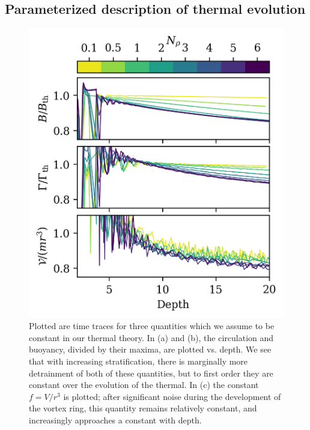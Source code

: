 \documentclass[twocolumn, amsmath, amsfonts, amssymb, trackchanges]{aastex62}
\begin{document}
\subsection{Parameterized description of thermal evolution}
\begin{figure}[t!]
    \includegraphics[width=\columnwidth]{constants.png}
    \caption{Plotted are time traces for three quantities which we assume to be constant
	in our thermal theory. In (a) and (b), the circulation and buoyancy, divided by their
	maxima, are plotted vs. depth. We see that with increasing stratification, there is marginally
	more detrainment of both of these quantities, but to first order they are constant over the
	evolution of the thermal. In (c) the constant $f = V/r^3$ is plotted; after significant
	noise during the development of the vortex ring, this quantity remains relatively constant, 
	and increasingly approaches a constant with depth.
    \label{fig:constants} }
\end{figure}
\end{document}
